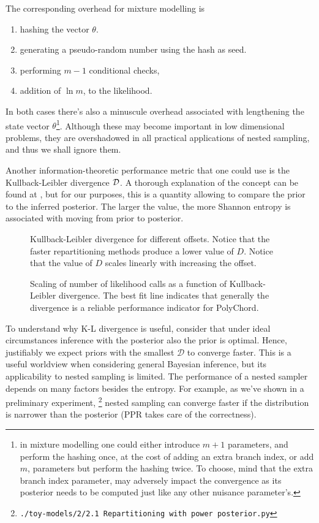 \documentclass[usenatbib]{mnras}
\begin{document}
The corresponding overhead for mixture modelling is
\begin{enumerate}
\item hashing the vector \(\theta\).
\item generating a pseudo-random number using the hash as seed.
\item performing \(m-1\) conditional checks,
\item addition of \(\ln m\), to the likelihood.
\end{enumerate}

In both cases there's also a minuscule overhead associated with
lengthening the state vector \(\theta\)\footnote{in mixture modelling one could either introduce \(m+1\)
parameters, and perform the hashing once, at the cost of adding an
extra branch index, or add \(m\), parameters but perform the hashing
twice. To choose, mind that the extra branch index parameter, may
adversely impact the convergence as its posterior needs to be computed
just like any other nuisance parameter's.}.  Although these may
become important in low dimensional problems, they are overshadowed
in all practical applications of nested sampling, and thus we shall
ignore them.

Another information-theoretic performance metric that one could use
is the Kullback-Leibler divergence \({\cal D}\). A thorough
explanation of the concept can be found at \cite{Kullback_1951}, but
for our purposes, this is a quantity allowing to compare the prior
to the inferred posterior. The larger the value, the more Shannon
entropy is associated with moving from prior to posterior. 

\begin{figure}
  
\caption{Kullback-Leibler divergence for different offsets. Notice that the faster repartitioning methods produce a lower value of \(D\). Notice that the value of \(D\) scales linearly with increasing the offset. \label{fig:kl-d}}
\end{figure}

\begin{figure}
  
\caption{Scaling of number of likelihood calls as a function of Kullback-Leibler divergence. The best fit line indicates that generally the divergence is a reliable performance indicator for PolyChord. \label{fig:kl-scaling}}
\end{figure}

To understand why K-L divergence is useful, consider that under
ideal circumstances inference with the posterior also the prior is
optimal. Hence, justifiably we expect priors with the smallest
\(\mathcal{D}\) to converge faster. This is a useful worldview when
considering general Bayesian inference, but its applicability to
nested sampling is limited. The performance of a nested sampler
depends on many factors besides the entropy. For example, as we've
shown in a preliminary experiment, \footnote{\texttt{./toy-models/2/2.1 Repartitioning with power posterior.py}} nested sampling can
converge faster if the distribution is narrower than the posterior
(PPR takes care of the correctness). 
\end{document}
